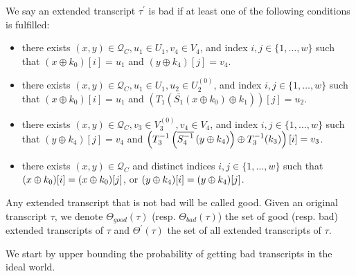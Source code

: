 \begin{definition}
\label{defn:bad-tau-4-rounds}

We say an extended transcript $\tau^{\prime}$ is bad if at least one of the following conditions is fulfilled:
\begin{itemize}
	\item[\bone]
	there exists $(x, y) \in \mathcal{Q}_{C}, u_1 \in U_1, v_4 \in V_4$, and index $i, j \in \{1, \ldots, w\}$ such that $\left(x \oplus k_{0}\right)[i]=u_1$ and $\left(y \oplus k_{4}\right)[j]=v_4$.
	\item[\btwo]
	there exists $(x,y) \in \mathcal{Q}_{C}, u_1 \in U_1, u_2\in U_2^{(0)}$, and index $i, j \in \{1, \ldots, w\}$ such that $\left(x \oplus k_{0}\right)[i]=u_1$ and $\left(T_{1}\left(\overline{S_1}\left(x \oplus k_{0}\right) \oplus k_{1}\right)\right)[j]=u_2$.
	\item[\bthree]
	there exists $(x,y) \in \mathcal{Q}_{C}, v_{3}\in V_3^{(0)}, v_{4}\in V_4$, and index $i, j \in \{1, \ldots, w\}$ such that $\left(y \oplus k_{4}\right)[j]=v_4$ and $\left(T_{3}^{-1}\left(\overline{S_4^{-1}}\left(y \oplus k_{4}\right)\right)\oplus T_{3}^{-1}(k_3)\right) [i]=v_3$.
	\item[\bfour]
	there exists $(x,y) \in \mathcal{Q}_{C}$ and distinct indices $i, j \in \{1, \ldots, w\}$ such that $(x\oplus k_0)[i]=(x\oplus k_0)[j]$, or $(y\oplus k_4)[i]=(y\oplus k_4)[j]$.
\end{itemize}
Any extended transcript that is not bad will be called good. Given an original transcript $\tau$, we denote $\Theta_{good}(\tau)$ (resp. $\Theta_{bad}(\tau)$) the set of good (resp. bad) extended transcripts of $\tau$ and $\Theta^{'}(\tau)$ the set of all extended transcripts of $\tau$.
\end{definition}



We start by upper bounding the probability of getting bad transcripts in the ideal world.


